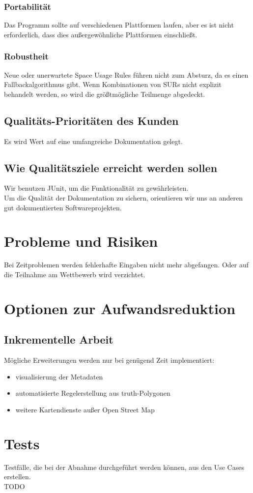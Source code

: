 \subsubsection{Portabilität}
Das Programm sollte auf verschiedenen Plattformen laufen, aber es ist nicht erforderlich, dass dies außergewöhnliche Plattformen einschließt.

\subsubsection{Robustheit}
Neue oder unerwartete Space Usage Rules führen nicht zum Absturz, da es einen Fallbackalgorithmus gibt. Wenn Kombinationen von 
SURs nicht explizit behandelt werden, so wird die größtmögliche Teilmenge abgedeckt.

\subsection{Qualitäts-Prioritäten des Kunden}
Es wird Wert auf eine umfangreiche Dokumentation gelegt.
\subsection{Wie Qualitätsziele erreicht werden sollen}
Wir benutzen JUnit, um die Funktionalität zu gewährleisten.\\
Um die Qualität der Dokumentation zu sichern, orientieren wir uns an anderen gut dokumentierten Softwareprojekten.
\section{Probleme und Risiken}
Bei Zeitproblemen werden fehlerhafte Eingaben nicht mehr abgefangen. Oder auf die Teilnahme am Wettbewerb wird verzichtet.
\section{Optionen zur Aufwandsreduktion}
\subsection{Inkrementelle Arbeit}
Mögliche Erweiterungen werden nur bei genügend Zeit implementiert:
\begin{itemize}
 \item visualisierung der Metadaten
 \item automatisierte Regelerstellung aus truth-Polygonen
 \item weitere Kartendienste außer Open Street Map
\end{itemize}

\section{Tests}
Testfälle, die bei der Abnahme durchgeführt werden können, aus den Use Cases erstellen.\\
TODO